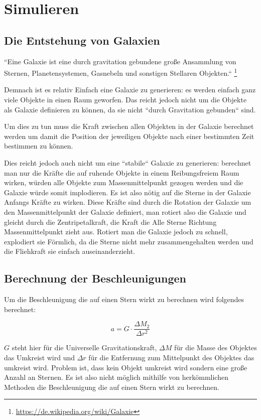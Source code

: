 \section{Simulieren}

\subsection{Die Entstehung von Galaxien}
``Eine Galaxie ist eine durch gravitation gebundene große Ansammlung von
Sternen, Planetensystemen, Gasnebeln und sonstigen Stellaren Objekten.``
\footnote{\url{https://de.wikipedia.org/wiki/Galaxie}}

Demnach ist es relativ Einfach eine Galaxie zu generieren: es werden einfach
ganz viele Objekte in einen Raum geworfen. Das reicht jedoch nicht um die
Objekte als Galaxie definieren zu können, da sie nicht ``durch Gravitation
gebunden`` sind.

Um dies zu tun muss die Kraft zwischen allen Objekten in der Galaxie berechnet
werden um damit die Position der jeweiligen Objekte nach einer bestimmten Zeit
bestimmen zu können.

Dies reicht jedoch auch nicht um eine ``stabile`` Galaxie zu generieren:
berechnet man nur die Kräfte die auf ruhende Objekte in einem Reibungsfreiem Raum
wirken, würden alle Objekte zum Massenmittelpunkt gezogen werden und die Galaxie
würde somit implodieren. Es ist also nötig auf die Sterne in der Galaxie
Anfangs Kräfte zu wirken.  Diese Kräfte sind durch die Rotation der Galaxie um
den Massenmittelpunkt der Galaxie definiert, man rotiert also die Galaxie und
gleicht durch die Zentripetalkraft, die Kraft die Alle Sterne Richtung
Massenmittelpunkt zieht aus. Rotiert man die Galaxie jedoch zu schnell,
explodiert sie Förmlich, da die Sterne nicht mehr zusammengehalten werden und
die Fliehkraft sie einfach auseinanderzieht.

\subsection{Berechnung der Beschleunigungen}
Um die Beschleunigung die auf einen Stern wirkt zu berechnen wird folgendes
berechnet:

\begin{equation} \label{eq:beschleunigung}
    a = G \cdot \frac{\Delta{M_2}}{\Delta{r}^2}
\end{equation}

\( G \) steht hier für die Universelle Gravitationskraft, \( \Delta M \) für die
Masse des Objektes das Umkreist wird und \( \Delta r \) für die Entfernung zum
Mittelpunkt des Objektes das umkreist wird.
Problem ist, dass kein Objekt umkreist wird sondern eine große Anzahl an Sternen.
Es ist also nicht möglich mithilfe von herkömmlichen Methoden die Beschleunigung
die auf einen Stern wirkt zu berechnen.

